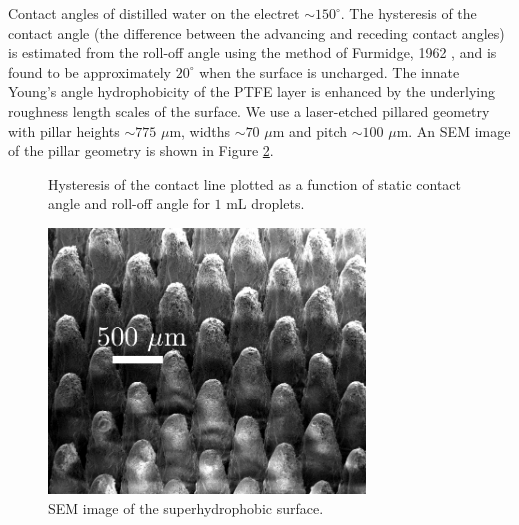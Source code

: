 \documentclass[12pt,a4paper,oneside]{book}
\begin{document}
Contact angles of distilled water on the electret $\sim 150^{\circ}$. The hysteresis of the contact angle (the difference between the advancing and receding contact angles) is estimated from the roll-off angle using the method of Furmidge, 1962 \cite{furmidge_studies_1962}, and is found to be approximately $20^{\circ}$ when the surface is uncharged. The innate Young's angle hydrophobicity of the PTFE layer is enhanced by the underlying roughness length scales of the surface. We use a laser-etched pillared geometry with pillar heights $\sim 775$ $\mu$m, widths $\sim 70$ $\mu$m and pitch $\sim 100$ $\mu$m. An SEM image of the pillar geometry is shown in Figure \ref{fig:SEM}.
\begin{figure}
    \centering
    
       \caption{Hysteresis of the contact line plotted as a function of static contact angle and roll-off angle for $1$ mL droplets.\label{fig:hysteresis}}
\end{figure}

\begin{figure}[ht]
 \centering
 \includegraphics[width=0.75\textwidth]{../figures/SEM.pdf}
 \caption{SEM image of the superhydrophobic surface.\label{fig:SEM}}
\end{figure}
\end{document}
